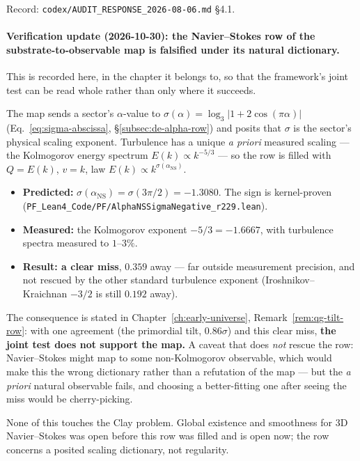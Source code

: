 \noindent Record: \texttt{codex/AUDIT\_RESPONSE\_2026-08-06.md} \S4.1.

\paragraph{Verification update (2026-10-30): the Navier--Stokes row of the
substrate-to-observable map is \textbf{falsified} under its natural
dictionary.}
This is recorded here, in the chapter it belongs to, so that the framework's
joint test can be read whole rather than only where it succeeds.

The map sends a sector's $\alpha$-value to
$\sigma(\alpha) = \log_3|1 + 2\cos(\pi\alpha)|$
(Eq.~\eqref{eq:sigma-abscissa}, \S\ref{subsec:de-alpha-row}) and posits that
$\sigma$ is the sector's physical scaling exponent. Turbulence has a unique
\emph{a priori} measured scaling --- the Kolmogorov energy spectrum
$E(k) \propto k^{-5/3}$ --- so the row is filled with
$Q = E(k)$, $v = k$, law $E(k) \propto k^{\sigma(\alpha_{\text{NS}})}$.

\begin{itemize}
\item \textbf{Predicted:} $\sigma(\alpha_{\text{NS}}) = \sigma(3\pi/2) =
-1.3080$. The sign is kernel-proven
(\texttt{PF\_Lean4\_Code/PF/AlphaNSSigmaNegative\_r229.lean}).
\item \textbf{Measured:} the Kolmogorov exponent $-5/3 = -1.6667$, with
turbulence spectra measured to $1$--$3\%$.
\item \textbf{Result: a clear miss}, $0.359$ away --- far outside measurement
precision, and not rescued by the other standard turbulence exponent
(Iroshnikov--Kraichnan $-3/2$ is still $0.192$ away).
\end{itemize}

\noindent The consequence is stated in
Chapter~\ref{ch:early-universe}, Remark~\ref{rem:qg-tilt-row}: with one
agreement (the primordial tilt, $0.86\sigma$) and this clear miss, \textbf{the
joint test does not support the map.} A caveat that does \emph{not} rescue the
row: Navier--Stokes might map to some non-Kolmogorov observable, which would
make this the wrong dictionary rather than a refutation of the map --- but the
\emph{a priori} natural observable fails, and choosing a better-fitting one
after seeing the miss would be cherry-picking.

\noindent None of this touches the Clay problem. Global existence and smoothness
for 3D Navier--Stokes was open before this row was filled and is open now; the
row concerns a posited scaling dictionary, not regularity.

